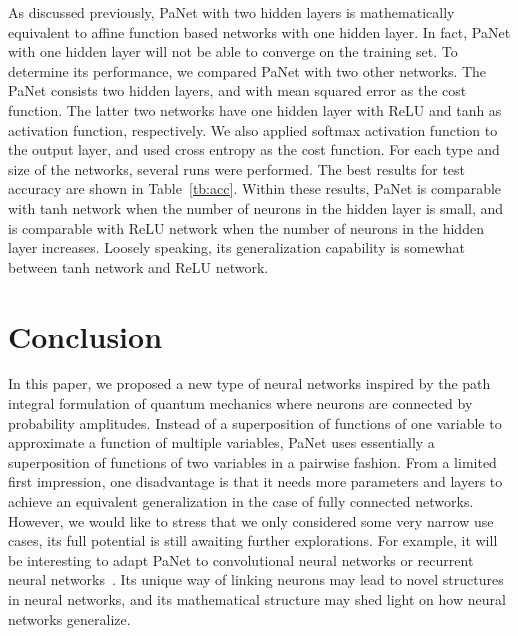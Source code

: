 \documentclass{article}
\begin{document}
As discussed previously, PaNet with two hidden layers is mathematically
equivalent to affine function based networks with one hidden layer. In fact,
PaNet with one hidden layer will not be able to converge on the training
set. To determine its performance, we compared PaNet with two other
networks. The PaNet consists two hidden layers, and with mean squared error
as the cost function. The latter two networks have one hidden layer with
ReLU and tanh as activation function, respectively. We also applied softmax
activation function to the output layer, and used cross entropy as the cost
function. For each type and size of the networks, several runs were
performed. The best results for test accuracy are shown in
Table~\ref{tb:acc}. Within these results, PaNet is comparable with tanh
network when the number of neurons in the hidden layer is small, and is
comparable with ReLU network when the number of neurons in the hidden layer
increases. Loosely speaking, its generalization capability is somewhat
between tanh network and ReLU network.

\section{Conclusion}
\label{sec:conclusion}
In this paper, we proposed a new type of neural networks inspired by the
path integral formulation of quantum mechanics where neurons are connected
by probability amplitudes. Instead of a superposition of functions of one
variable to approximate a function of multiple variables, PaNet uses
essentially a superposition of functions of two variables in a pairwise
fashion. From a limited first impression, one disadvantage is that it needs
more parameters and layers to achieve an equivalent generalization in the
case of fully connected networks. However, we would like to stress that we
only considered some very narrow use cases, its full potential is still
awaiting further explorations. For example, it will be interesting to adapt
PaNet to convolutional neural networks or recurrent neural
networks~\cite{rnn}. Its unique way of linking neurons may lead to novel
structures in neural networks, and its mathematical structure may shed light
on how neural networks generalize.




\end{document}
